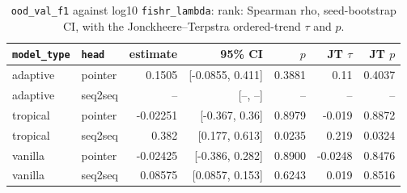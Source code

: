 \documentclass[10pt]{article}
\begin{document}
{\small
\begin{longtable}{llrrrrr}
\caption{\texttt{ood\_val\_f1} against log10 \texttt{fishr\_lambda}: rank: Spearman rho, seed-bootstrap CI, with the Jonckheere--Terpstra ordered-trend $\tau$ and $p$.}\label{tab:trend-ood_val_f1}\\
\toprule
\texttt{model\_type} & \texttt{head} & estimate & 95\% CI & $p$ & JT $\tau$ & JT $p$\\
\midrule
\endhead
adaptive & pointer & 0.1505 & [-0.0855, 0.411] & 0.3881 & 0.11 & 0.4037\\
adaptive & seq2seq & -- & [--, --] & -- & -- & --\\
tropical & pointer & -0.02251 & [-0.367, 0.36] & 0.8979 & -0.019 & 0.8872\\
tropical & seq2seq & 0.382 & [0.177, 0.613] & 0.0235 & 0.219 & 0.0324\\
vanilla & pointer & -0.02425 & [-0.386, 0.282] & 0.8900 & -0.0248 & 0.8476\\
vanilla & seq2seq & 0.08575 & [0.0857, 0.153] & 0.6243 & 0.019 & 0.8516\\
\bottomrule
\end{longtable}
}
\end{document}
